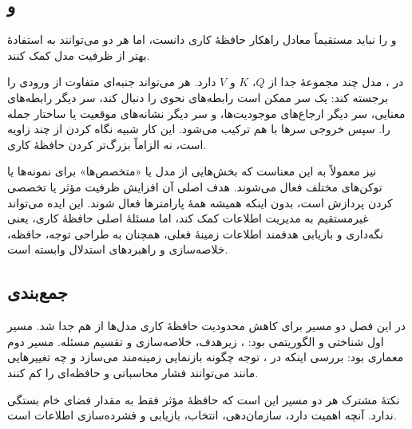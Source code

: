 \subsection{ و }
 و  را نباید مستقیماً معادل راهکار حافظهٔ کاری دانست، اما هر دو می‌توانند به استفادهٔ بهتر از ظرفیت مدل کمک کنند.

در ، مدل چند مجموعهٔ جدا از \(Q\)، \(K\) و \(V\) دارد. هر  می‌تواند جنبه‌ای متفاوت از ورودی را برجسته کند: یک سر ممکن است رابطه‌های نحوی را دنبال کند، سر دیگر رابطه‌های معنایی، سر دیگر ارجاع‌های موجودیت‌ها، و سر دیگر نشانه‌های موقعیت یا ساختار جمله را. سپس خروجی سرها با هم ترکیب می‌شود. این کار شبیه نگاه کردن از چند زاویه است، نه الزاماً بزرگ‌تر کردن حافظهٔ کاری.

 نیز معمولاً به این معناست که بخش‌هایی از مدل یا «متخصص‌ها» برای نمونه‌ها یا توکن‌های مختلف فعال می‌شوند. هدف اصلی آن افزایش ظرفیت مؤثر یا تخصصی کردن پردازش است، بدون اینکه همیشه همهٔ پارامترها فعال شوند. این ایده می‌تواند غیرمستقیم به مدیریت اطلاعات کمک کند، اما مسئلهٔ اصلی حافظهٔ کاری، یعنی نگه‌داری و بازیابی هدفمند اطلاعات زمینهٔ فعلی، همچنان به طراحی توجه، حافظه، خلاصه‌سازی و راهبردهای استدلال وابسته است.

\subsection{جمع‌بندی}
در این فصل دو مسیر برای کاهش محدودیت حافظهٔ کاری مدل‌ها از هم جدا شد. مسیر اول شناختی و الگوریتمی بود: ، زیرهدف، خلاصه‌سازی و تقسیم مسئله. مسیر دوم معماری بود: بررسی اینکه در ، توجه چگونه بازنمایی زمینه‌مند می‌سازد و چه تغییرهایی مانند  می‌توانند فشار محاسباتی و حافظه‌ای را کم کنند.

نکتهٔ مشترک هر دو مسیر این است که حافظهٔ مؤثر فقط به مقدار فضای خام بستگی ندارد. آنچه اهمیت دارد، سازمان‌دهی، انتخاب، بازیابی و فشرده‌سازی اطلاعات است.
